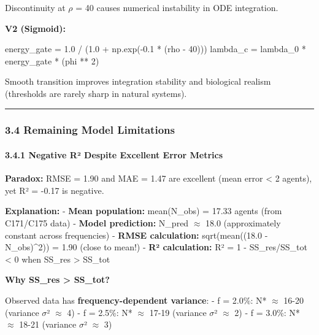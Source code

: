 \documentclass[
]{article}
\newenvironment{Shaded}{}{}
\newcommand{\DecValTok}[1]{\textcolor[rgb]{0.25,0.63,0.44}{#1}}
\newcommand{\FloatTok}[1]{\textcolor[rgb]{0.25,0.63,0.44}{#1}}
\newcommand{\NormalTok}[1]{#1}
\newcommand{\OperatorTok}[1]{\textcolor[rgb]{0.40,0.40,0.40}{#1}}
\begin{document}
Discontinuity at $\rho$ = 40 causes numerical instability in ODE integration.

\textbf{V2 (Sigmoid):}

\begin{Shaded}
\begin{Highlighting}[]
\NormalTok{energy\_gate }\OperatorTok{=} \FloatTok{1.0} \OperatorTok{/}\NormalTok{ (}\FloatTok{1.0} \OperatorTok{+}\NormalTok{ np.exp(}\OperatorTok{{-}}\FloatTok{0.1} \OperatorTok{*}\NormalTok{ (rho }\OperatorTok{{-}} \DecValTok{40}\NormalTok{)))}
\NormalTok{lambda\_c }\OperatorTok{=}\NormalTok{ lambda\_0 }\OperatorTok{*}\NormalTok{ energy\_gate }\OperatorTok{*}\NormalTok{ (phi }\OperatorTok{**} \DecValTok{2}\NormalTok{)}
\end{Highlighting}
\end{Shaded}

Smooth transition improves integration stability and biological realism
(thresholds are rarely sharp in natural systems).

\begin{center}\rule{0.5\linewidth}{0.5pt}\end{center}

\subsubsection{3.4 Remaining Model
Limitations}\label{remaining-model-limitations}

\paragraph{3.4.1 Negative R² Despite Excellent Error
Metrics}\label{negative-ruxb2-despite-excellent-error-metrics}

\textbf{Paradox:} RMSE = 1.90 and MAE = 1.47 are excellent (mean error
\textless{} 2 agents), yet R² = -0.17 is negative.

\textbf{Explanation:} - \textbf{Mean population:} mean(N\_obs) = 17.33
agents (from C171/C175 data) - \textbf{Model prediction:} N\_pred $\approx$ 18.0
(approximately constant across frequencies) - \textbf{RMSE calculation:}
sqrt(mean((18.0 - N\_obs)\^{}2)) = 1.90 (close to mean!) - \textbf{R²
calculation:} R² = 1 - SS\_res/SS\_tot \textless{} 0 when SS\_res
\textgreater{} SS\_tot

\textbf{Why SS\_res \textgreater{} SS\_tot?}

Observed data has \textbf{frequency-dependent variance}: - f = 2.0\%: N*
$\approx$ 16-20 (variance $\sigma$² $\approx$ 4) - f = 2.5\%: N* $\approx$ 17-19 (variance $\sigma$² $\approx$ 2) - f
= 3.0\%: N* $\approx$ 18-21 (variance $\sigma$² $\approx$ 3)
\end{document}
